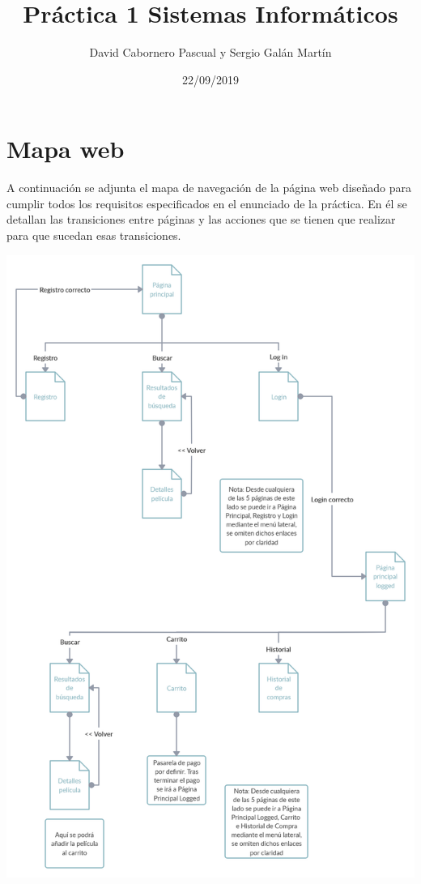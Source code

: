 \documentclass[]{article}
\title{Práctica 1 Sistemas Informáticos}
\author{David Cabornero Pascual y Sergio Galán Martín}
\date{22/09/2019}
\begin{document}
\maketitle



\pagebreak

\section{Mapa web}

A continuación se adjunta el mapa de navegación de la página web diseñado para cumplir todos los requisitos especificados en el enunciado de la práctica. En él se detallan las transiciones entre páginas y las acciones que se tienen que realizar para que sucedan esas transiciones.

\includegraphics[scale=0.18]{mockup/WebMap.jpg}
\end{document}
